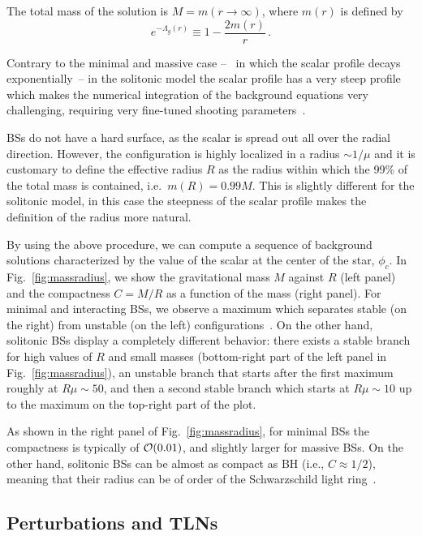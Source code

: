 \documentclass[aps,twocolumn,showpacs,preprintnumbers,nofootinbib,prd,superscriptaddress,groupedaddress,10pt]{revtex4-1}
\def\be{\begin{equation}}
\def\ee{\end{equation}}
\begin{document}
The total mass of the solution is $M=m(r\to\infty)$, where $m(r)$ is defined by
%
\be
e^{-\Lambda_g(r)}\equiv1-\frac{2m(r)}{r}\,.
\ee
%

Contrary to the minimal and massive case --~ in which the scalar profile decays exponentially~-- in the solitonic model the scalar profile has a very steep profile which makes the numerical integration of the background equations very challenging, requiring very fine-tuned shooting parameters~\cite{Macedo:2013jja}.



BSs do not have a hard surface,
as the scalar is spread out all over the radial direction.
However, the configuration is highly localized in a radius $\sim1/\mu$ and it
is customary to define the effective radius $R$ as the radius
within which the 99\% of the total mass is contained, i.e.\ $m(R)=0.99M$.
This is slightly different for the solitonic model, in this case the steepness of
the scalar profile makes the definition of the radius more natural.

By using the above procedure, we can compute a sequence of background solutions
characterized by the value of the scalar at the center
of the star, $\phi_c$. In Fig.~\ref{fig:massradius}, we show the gravitational mass $M$ against $R$ (left panel) and the compactness $C=M/R$ as a function of the mass (right panel).
%
For minimal and interacting BSs, we observe a maximum which separates stable (on the right)
from unstable (on the left) configurations~\cite{Gleiser:1988rq,Gleiser:1988ih,Hawley:2000dt}.
%
On the other hand, solitonic BSs display a completely different behavior: there exists a stable branch
for high values of $R$ and small masses (bottom-right part of the left panel in Fig.~\ref{fig:massradius}),
an unstable branch that starts after the first maximum roughly at $R\mu\sim50$, and
then a second stable branch which starts at $R\mu\sim10$ up to the maximum
on the top-right part of the plot.

As shown in the right panel of Fig.~\ref{fig:massradius}, for minimal BSs the compactness is typically of ${\cal O}(0.01)$, and slightly larger for massive BSs.
On the other hand, solitonic BSs can be almost as compact
as BH (i.e., $C\approx1/2$), meaning that their radius can be of order of
the Schwarzschild light ring~\cite{Cardoso:2014sna,Cardoso:2016oxy}.

\subsection{Perturbations and TLNs}
\end{document}
